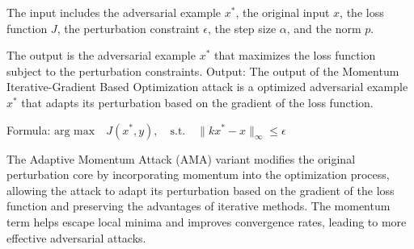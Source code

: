 The input includes the adversarial example $x^*$, the original input $x$, the loss function $J$, the perturbation constraint $\epsilon$, the step size $\alpha$, and the norm $p$.

The output is the adversarial example $x^*$ that maximizes the loss function subject to the perturbation constraints.
Output: The output of the Momentum Iterative-Gradient Based Optimization attack is a optimized adversarial example $x^*$ that adapts its perturbation based on the gradient of the loss function.

Formula: $\text{arg max} \quad J(x^*, y), \quad \text{s.t.} \quad \| kx^* - x \|_\infty \leq \epsilon$

The Adaptive Momentum Attack (AMA) variant modifies the original perturbation core by incorporating momentum into the optimization process, allowing the attack to adapt its perturbation based on the gradient of the loss function and preserving the advantages of iterative methods. The momentum term helps escape local minima and improves convergence rates, leading to more effective adversarial attacks.